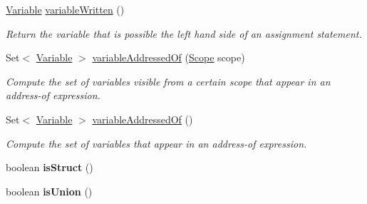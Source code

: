 \begin{DoxyCompactItemize}
\hyperlink{interfaceedu_1_1udel_1_1cis_1_1vsl_1_1civl_1_1model_1_1IF_1_1variable_1_1Variable}{Variable} \hyperlink{classedu_1_1udel_1_1cis_1_1vsl_1_1civl_1_1model_1_1common_1_1expression_1_1CommonDotExpression_a4ef9d18ad210aae6c830b865d8361357}{variable\+Written} ()
\begin{DoxyCompactList}\small\item\em Return the variable that is possible the left hand side of an assignment statement. \end{DoxyCompactList}\item 
Set$<$ \hyperlink{interfaceedu_1_1udel_1_1cis_1_1vsl_1_1civl_1_1model_1_1IF_1_1variable_1_1Variable}{Variable} $>$ \hyperlink{classedu_1_1udel_1_1cis_1_1vsl_1_1civl_1_1model_1_1common_1_1expression_1_1CommonDotExpression_a2687745803038eb2e1b0c09248265493}{variable\+Addressed\+Of} (\hyperlink{interfaceedu_1_1udel_1_1cis_1_1vsl_1_1civl_1_1model_1_1IF_1_1Scope}{Scope} scope)
\begin{DoxyCompactList}\small\item\em Compute the set of variables visible from a certain scope that appear in an address-\/of expression. \end{DoxyCompactList}\item 
Set$<$ \hyperlink{interfaceedu_1_1udel_1_1cis_1_1vsl_1_1civl_1_1model_1_1IF_1_1variable_1_1Variable}{Variable} $>$ \hyperlink{classedu_1_1udel_1_1cis_1_1vsl_1_1civl_1_1model_1_1common_1_1expression_1_1CommonDotExpression_afd441f9d644ee47866736a60c58ef334}{variable\+Addressed\+Of} ()
\begin{DoxyCompactList}\small\item\em Compute the set of variables that appear in an address-\/of expression. \end{DoxyCompactList}\item 
\hypertarget{classedu_1_1udel_1_1cis_1_1vsl_1_1civl_1_1model_1_1common_1_1expression_1_1CommonDotExpression_ab3871a4322191df0b58627620d5790ff}{}boolean {\bfseries is\+Struct} ()\label{classedu_1_1udel_1_1cis_1_1vsl_1_1civl_1_1model_1_1common_1_1expression_1_1CommonDotExpression_ab3871a4322191df0b58627620d5790ff}

\item 
\hypertarget{classedu_1_1udel_1_1cis_1_1vsl_1_1civl_1_1model_1_1common_1_1expression_1_1CommonDotExpression_a3c0203096538b8901c66eb8a3b13d612}{}boolean {\bfseries is\+Union} ()\label{classedu_1_1udel_1_1cis_1_1vsl_1_1civl_1_1model_1_1common_1_1expression_1_1CommonDotExpression_a3c0203096538b8901c66eb8a3b13d612}


\end{DoxyCompactItemize}
